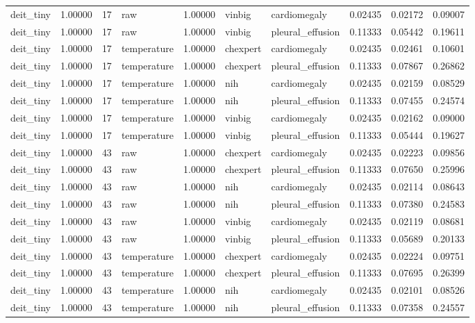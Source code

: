 \begin{tabular}{lrllrllrrr}
deit\_tiny & 1.00000 & 17 & raw & 1.00000 & vinbig & cardiomegaly & 0.02435 & 0.02172 & 0.09007 \\
deit\_tiny & 1.00000 & 17 & raw & 1.00000 & vinbig & pleural\_effusion & 0.11333 & 0.05442 & 0.19611 \\
deit\_tiny & 1.00000 & 17 & temperature & 1.00000 & chexpert & cardiomegaly & 0.02435 & 0.02461 & 0.10601 \\
deit\_tiny & 1.00000 & 17 & temperature & 1.00000 & chexpert & pleural\_effusion & 0.11333 & 0.07867 & 0.26862 \\
deit\_tiny & 1.00000 & 17 & temperature & 1.00000 & nih & cardiomegaly & 0.02435 & 0.02159 & 0.08529 \\
deit\_tiny & 1.00000 & 17 & temperature & 1.00000 & nih & pleural\_effusion & 0.11333 & 0.07455 & 0.24574 \\
deit\_tiny & 1.00000 & 17 & temperature & 1.00000 & vinbig & cardiomegaly & 0.02435 & 0.02162 & 0.09000 \\
deit\_tiny & 1.00000 & 17 & temperature & 1.00000 & vinbig & pleural\_effusion & 0.11333 & 0.05444 & 0.19627 \\
deit\_tiny & 1.00000 & 43 & raw & 1.00000 & chexpert & cardiomegaly & 0.02435 & 0.02223 & 0.09856 \\
deit\_tiny & 1.00000 & 43 & raw & 1.00000 & chexpert & pleural\_effusion & 0.11333 & 0.07650 & 0.25996 \\
deit\_tiny & 1.00000 & 43 & raw & 1.00000 & nih & cardiomegaly & 0.02435 & 0.02114 & 0.08643 \\
deit\_tiny & 1.00000 & 43 & raw & 1.00000 & nih & pleural\_effusion & 0.11333 & 0.07380 & 0.24583 \\
deit\_tiny & 1.00000 & 43 & raw & 1.00000 & vinbig & cardiomegaly & 0.02435 & 0.02119 & 0.08681 \\
deit\_tiny & 1.00000 & 43 & raw & 1.00000 & vinbig & pleural\_effusion & 0.11333 & 0.05689 & 0.20133 \\
deit\_tiny & 1.00000 & 43 & temperature & 1.00000 & chexpert & cardiomegaly & 0.02435 & 0.02224 & 0.09751 \\
deit\_tiny & 1.00000 & 43 & temperature & 1.00000 & chexpert & pleural\_effusion & 0.11333 & 0.07695 & 0.26399 \\
deit\_tiny & 1.00000 & 43 & temperature & 1.00000 & nih & cardiomegaly & 0.02435 & 0.02101 & 0.08526 \\
deit\_tiny & 1.00000 & 43 & temperature & 1.00000 & nih & pleural\_effusion & 0.11333 & 0.07358 & 0.24557 \\

\end{tabular}
